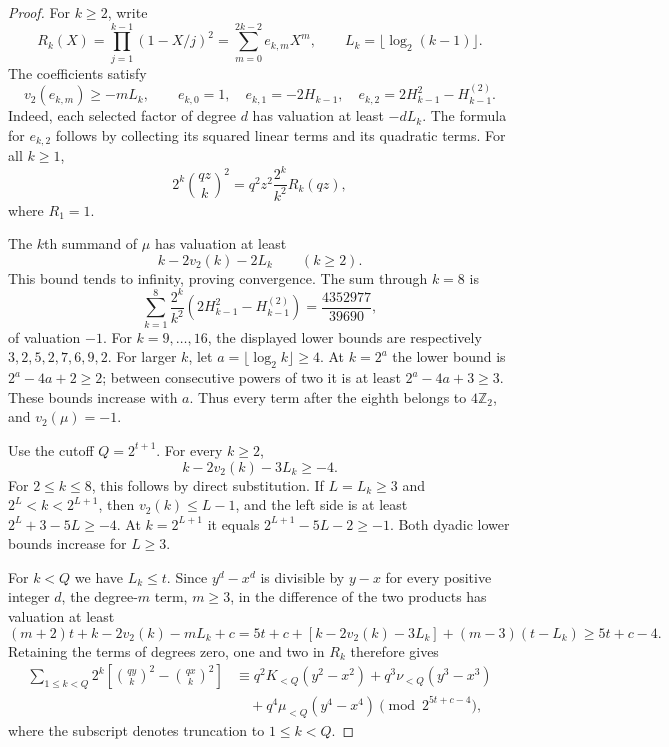 \documentclass[11pt]{article}
\theoremstyle{remark}\newtheorem{remark}[theorem]{Remark}
\newcommand{\Ztwo}{\mathbb Z_2}\newcommand{\Qtwo}{\mathbb Q_2}
\begin{document}
\begin{proof}
For $k\ge2$, write
\[
 R_k(X)=\prod_{j=1}^{k-1}(1-X/j)^2
       =\sum_{m=0}^{2k-2}e_{k,m}X^m,
 \qquad L_k=\lfloor\log_2(k-1)\rfloor.
\]
The coefficients satisfy
\[
 v_2(e_{k,m})\ge-mL_k,\qquad
 e_{k,0}=1,\quad e_{k,1}=-2H_{k-1},\quad
 e_{k,2}=2H_{k-1}^2-H_{k-1}^{(2)}.
\]
Indeed, each selected factor of degree $d$ has valuation at least
$-dL_k$. The formula for $e_{k,2}$ follows by collecting its squared
linear terms and its quadratic terms. For all $k\ge1$,
\[
 2^k\binom{qz}{k}^2=q^2z^2\frac{2^k}{k^2}R_k(qz),
\]
where $R_1=1$.

The $k$th summand of $\mu$ has valuation at least
\[
 k-2v_2(k)-2L_k\qquad(k\ge2).
\]
This bound tends to infinity, proving convergence. The sum through
$k=8$ is
\[
 \sum_{k=1}^8\frac{2^k}{k^2}
       \left(2H_{k-1}^2-H_{k-1}^{(2)}\right)
       =\frac{4352977}{39690},
\]
of valuation $-1$. For $k=9,\ldots,16$, the displayed lower bounds
are respectively $3,2,5,2,7,6,9,2$.
For larger $k$, let $a=\lfloor\log_2k\rfloor\ge4$.
At $k=2^a$ the lower bound is $2^a-4a+2\ge2$;
between consecutive powers of two it is at least
$2^a-4a+3\ge3$. These bounds increase with $a$.
Thus every term after the eighth belongs to $4\Ztwo$, and
$v_2(\mu)=-1$.

Use the cutoff $Q=2^{t+1}$. For every $k\ge2$,
\begin{equation}\label{eq:quartic-degree-bound}
 k-2v_2(k)-3L_k\ge-4.
\end{equation}
For $2\le k\le8$, this follows by direct substitution.
If $L=L_k\ge3$ and $2^L<k<2^{L+1}$, then
$v_2(k)\le L-1$, and the left side is at least
$2^L+3-5L\ge-4$. At $k=2^{L+1}$ it equals
$2^{L+1}-5L-2\ge-1$. Both dyadic lower bounds increase for $L\ge3$.

For $k<Q$ we have $L_k\le t$. Since $y^d-x^d$ is divisible by
$y-x$ for every positive integer $d$, the degree-$m$ term, $m\ge3$,
in the difference of the two products has valuation at least
\[
 (m+2)t+k-2v_2(k)-mL_k+c
 =5t+c+[k-2v_2(k)-3L_k]+(m-3)(t-L_k)
 \ge5t+c-4.
\]
Retaining the terms of degrees zero, one and two in $R_k$ therefore gives
\begin{align*}
 \sum_{1\le k<Q}2^k
  \left[\binom{qy}{k}^2-\binom{qx}{k}^2\right]
 &\equiv q^2K_{<Q}(y^2-x^2)
       +q^3\nu_{<Q}(y^3-x^3)\\
 &\hspace{1em}+q^4\mu_{<Q}(y^4-x^4)
       \pmod{2^{5t+c-4}},
\end{align*}
where the subscript denotes truncation to $1\le k<Q$.


\end{proof}
\end{document}
